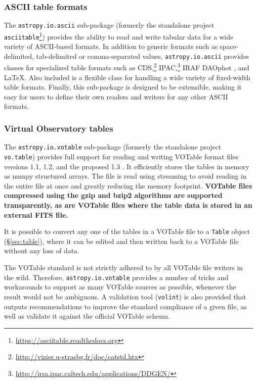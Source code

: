 \documentclass[traditabstract]{aa}
\begin{document}
\subsubsection{ASCII table formats}

\label{sec:ascii}


The \texttt{astropy.io.ascii} sub-package (formerly the standalone project
\texttt{asciitable}\footnote{\url{https://asciitable.readthedocs.org}})
provides the ability to read and write tabular data for a wide variety of
ASCII-based formats. In addition to generic formats such as space-delimited,
tab-delimited or comma-separated values, \texttt{astropy.io.ascii} provides
classes for specialized table formats such as
CDS,\footnote{\url{http://vizier.u-strasbg.fr/doc/catstd.htx}}
IPAC,\footnote{\url{http://irsa.ipac.caltech.edu/applications/DDGEN/}}
IRAF DAOphot \citep{daophot}, and LaTeX. Also included is a flexible class for handling a wide
variety of fixed-width table formats. Finally, this sub-package is designed to be
extensible, making it easy for users to define their own readers and writers for
any other ASCII formats.

\subsubsection{Virtual Observatory tables}

\label{sec:votable}


The \texttt{astropy.io.votable} sub-package (formerly the standalone
project \texttt{vo.table}) provides full support for reading and
writing VOTable format files versions 1.1, 1.2, and the proposed 1.3
\citep{ochsenbein2004votable,ochsenbein2009votable}. It efficiently
stores the tables in memory as \gls{numpy} structured arrays. The file
is read using streaming to avoid reading in the entire file at once
and greatly reducing the memory footprint. \textbf{VOTable files compressed
using the gzip and bzip2 algorithms are supported transparently, as are
VOTable files where the table data is stored in an external FITS file.}

It is possible to convert any one of the tables in a VOTable file to a
\texttt{Table} object (\S\ref{sec:table}), where it can be edited and then
written back to a VOTable file without any loss of data.

The VOTable standard is not strictly adhered to by all VOTable file writers in
the wild. Therefore, \texttt{astropy.io.votable} provides a number of tricks
and workarounds to support as many VOTable sources as possible, whenever the
result would not be ambiguous. A validation tool (\texttt{volint}) is also
provided that outputs recommendations to improve the standard compliance of a
given file, as well as validate it against the official VOTable schema.
\end{document}
